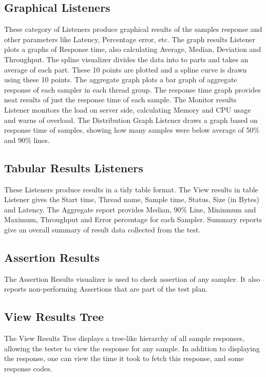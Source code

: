 \documentclass[12pt]{book}
\begin{document}
 \subsection{Graphical Listeners}
 These category of Listeners produce graphical results of the samples response and other parameters like Latency, Percentage error, etc.
 The graph results Listener plots a graphs of Response time, also calculating Average, Median, Deviation and Throughput.
 The spline visualizer divides the data into to parts and takes an average of each part. These 10 points are plotted and a spline curve is drawn 
 using these 10 points. The aggregate graph plots a bar graph of aggregate response of each sampler in each thread group. The response time graph 
 provides neat results of just the response time of each sample. The Monitor results Listener monitors the load on server side, calculating Memory and 
 CPU usage and warns of overload. The Distribution Graph Listener draws a graph based on response time of samples, showing how many samples were below 
 average of 50\% and 90\% lines.
 
 \subsection{Tabular Results Listeners}
 These Listeners produce results in a tidy table format. The View results in table Listener gives the Start time, Thread name, Sample time,
 Status, Size (in Bytes) and Latency. The Aggregate report provides Median, 90\% Line, Mininmum and Maximum, Throughput and Error percentage 
 for each Sampler. Summary reports give an overall summary of result data collected from the test.
 
 \subsection{Assertion Results}
 The Assertion Results visualizer is used to check assertion of any sampler. It also reports non-performing Assertions that are part of the test plan.
 
 \subsection{View Results Tree}
 The View Results Tree displays a tree-like hierarchy of all sample responses, allowing the tester to view the response for any sample. 
 In addition to displaying the response, one can view the time it took to fetch this response, and some response codes.
 
\end{document}

